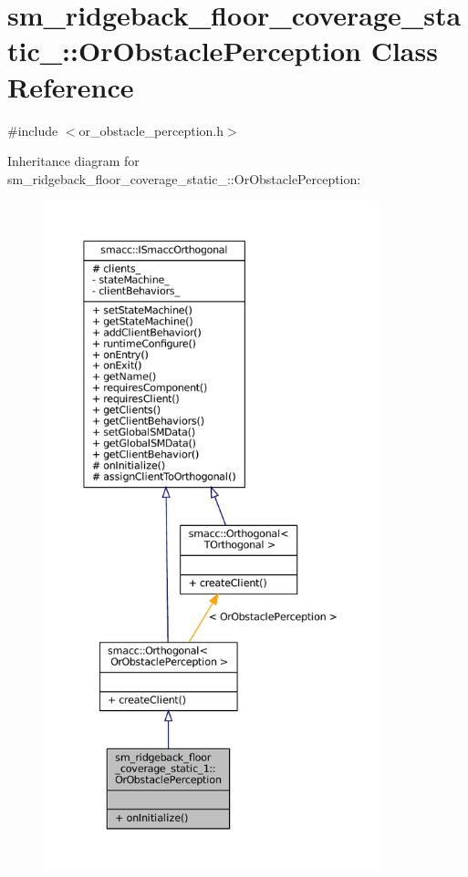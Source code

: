 \hypertarget{classsm__ridgeback__floor__coverage__static__1_1_1OrObstaclePerception}{}\section{sm\+\_\+ridgeback\+\_\+floor\+\_\+coverage\+\_\+static\+\_\+:\+:Or\+Obstacle\+Perception Class Reference}
\label{classsm__ridgeback__floor__coverage__static__1_1_1OrObstaclePerception}


{\ttfamily \#include $<$or\+\_\+obstacle\+\_\+perception.\+h$>$}



Inheritance diagram for sm\+\_\+ridgeback\+\_\+floor\+\_\+coverage\+\_\+static\+\_\+:\+:Or\+Obstacle\+Perception\+:
\nopagebreak
\begin{figure}[H]
\begin{center}
\leavevmode
\includegraphics[height=550pt]{classsm__ridgeback__floor__coverage__static__1_1_1OrObstaclePerception__inherit__graph}
\end{center}
\end{figure}


